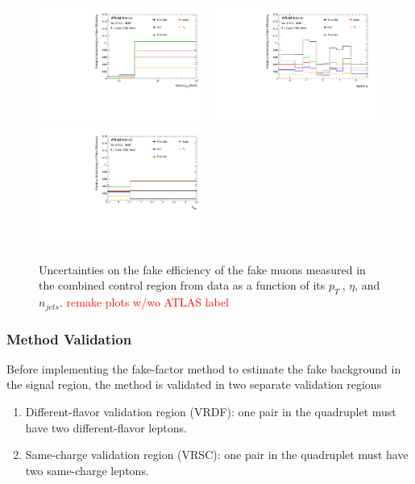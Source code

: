 \begin{figure}[htb]
        \begin{center}
        \includegraphics[width = 0.49\textwidth]{figures/Analysis/Background/SystematicUncertainties3D_Muon_pT.pdf}
        \includegraphics[width = 0.49\textwidth]{figures/Analysis/Background/SystematicUncertainties3D_Muon_eta.pdf}\\
        \includegraphics[width = 0.49\textwidth]{figures/Analysis/Background/SystematicUncertainties3D_Muon_njet.pdf} 
        \end{center}
    \caption{Uncertainties on the fake efficiency of the fake muons measured in the combined control region from data as a function of its $p_{T}~$, $\eta$, and $n_{jets}$. \textcolor{red}{remake plots w/wo ATLAS label} \label{fig:FakeEffUnc_3D_Muon}}
\end{figure}


\subsubsection{Method Validation}
\label{subsubsec:Validation}
Before implementing the fake-factor method to estimate the fake background in the signal region, the method is validated in two separate validation regions
\begin{enumerate}
    \item{ Different-flavor validation region (VRDF): one pair in the quadruplet must have two different-flavor leptons.}
    \item{ Same-charge validation region (VRSC): one pair in the quadruplet must have two same-charge leptons.}
\end{enumerate}

